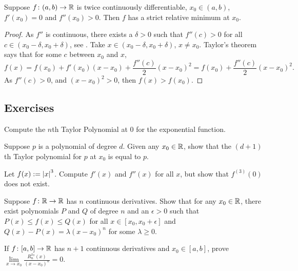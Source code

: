 \begin{prop}
Suppose $f \colon (a,b) \to {\mathbb{R}}$ is twice continuously differentiable,
$x_0 \in (a,b)$, $f'(x_0) = 0$ and $f''(x_0) > 0$.  Then $f$ has a strict relative
minimum at $x_0$.
\end{prop}

\begin{proof}
As $f''$ is continuous, there exists a $\delta > 0$
such that $f''(c) > 0$ for all $c \in (x_0-\delta,x_0+\delta)$,
see .
Take $x \in (x_0-\delta,x_0+\delta)$, $x \not= x_0$.
Taylor's theorem says that for some $c$ between $x_0$ and $x$,
\begin{equation*}
f(x) 
=
f(x_0) + f'(x_0) (x-x_0) +
\frac{f''(c)}{2}{(x-x_0)}^{2} 
=
f(x_0) + \frac{f''(c)}{2}{(x-x_0)}^{2}  .
\end{equation*}
As $f''(c) > 0$, and ${(x-x_0)}^2 > 0$, then $f(x) > f(x_0)$.
\end{proof}

\subsection{Exercises}

\begin{exercise}
Compute the $n$th Taylor Polynomial at $0$ for the exponential function.
\end{exercise}

\begin{exercise}
Suppose $p$ is a polynomial of degree $d$.  Given any $x_0 \in {\mathbb{R}}$,
show that
the $(d+1)$th Taylor polynomial for $p$ at $x_0$ is equal to $p$.
\end{exercise}

\begin{exercise}
Let $f(x) := \left\lvert {x} \right\rvert^3$.  Compute $f'(x)$ and $f''(x)$ for all $x$,
but show that $f^{(3)}(0)$ does not exist.
\end{exercise}

\begin{exercise}
Suppose $f \colon {\mathbb{R}} \to {\mathbb{R}}$ has $n$ continuous derivatives.  Show
that for any $x_0 \in {\mathbb{R}}$,
there exist polynomials $P$ and $Q$ of degree $n$ and 
an $\epsilon > 0$ such that $P(x) \leq f(x) \leq Q(x)$ for all $x \in
[x_0,x_0+\epsilon]$  and
$Q(x)-P(x) = \lambda {(x-x_0)}^n$ for some $\lambda \geq 0$.
\end{exercise}

\begin{exercise}
If $f \colon [a,b] \to {\mathbb{R}}$ has $n+1$ continuous derivatives
and $x_0 \in [a,b]$,
prove
$\lim\limits_{x\to x_0} \frac{R_n^{x_0}(x)}{{(x-x_0)}^n} = 0$.
\end{exercise}

